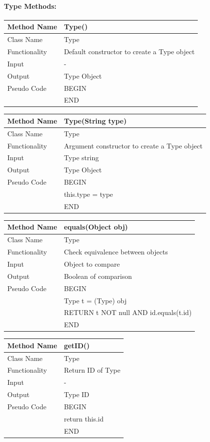 \documentclass[12pt]{article}
\begin{document}
\paragraph{Type Methods:}
\begin{tabular}{ |p{3cm}||p{\colWidth}|  }
	\hline
	Method Name & Type()\\
	\hline
	Class Name & Type\\
	\hline
	Functionality & Default constructor to create a Type object\\
	\hline
	Input & -\\
	\hline
	Output & Type Object\\
	\hline
	Pseudo Code&BEGIN\\&END\\
	\hline
\end{tabular}            

\begin{tabular}{ |p{3cm}||p{\colWidth}|  }
	
	\hline
	Method Name & Type(String type)\\
	\hline
	Class Name & Type\\
	\hline
	Functionality & Argument constructor to create a Type object\\
	\hline
	Input & Type string\\
	\hline
	Output & Type Object\\
	\hline
	Pseudo Code&BEGIN\\ & this.type = type\\&END\\
	\hline
\end{tabular}        

\begin{tabular}{ |p{3cm}||p{\colWidth}|  }
	\hline
	Method Name & equals(Object obj)\\
	\hline
	Class Name & Type\\
	\hline
	Functionality & Check equivalence between objects\\
	\hline
	Input & Object to compare\\
	\hline
	Output & Boolean of comparison\\
	\hline
	Pseudo Code & BEGIN\\
	& Type t = (Type) obj \\
	& RETURN t NOT null AND id.equals(t.id) \\
	& END\\
	\hline
\end{tabular}        

\begin{tabular}{ |p{3cm}||p{\colWidth}|  }
	\hline
	Method Name & getID()\\
	\hline
	Class Name & Type\\
	\hline
	Functionality & Return ID of Type\\
	\hline
	Input & -\\
	\hline
	Output & Type ID\\
	\hline
	Pseudo Code&BEGIN\\ & return this.id\\&END\\
	\hline
\end{tabular}        
\end{document}
